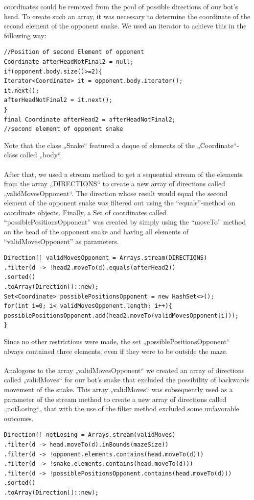 \documentclass[a4paper,12pt]{article}
\begin{document}
coordinates could be removed from the pool of possible directions of our bot’s head. To create such
an array, it was necessary to determine the coordinate of the second element of the opponent snake.
We used an iterator to achieve this in the following way:\\
\begin{verbatim}
//Position of second Element of opponent
Coordinate afterHeadNotFinal2 = null;
if(opponent.body.size()>=2){
Iterator<Coordinate> it = opponent.body.iterator();
it.next();
afterHeadNotFinal2 = it.next();
}
final Coordinate afterHead2 = afterHeadNotFinal2;
//second element of opponent snake
\end{verbatim}
Note that the class „Snake“ featured a deque of elements of the „Coordinate“-class called „body“.\\
\\
After that, we used a stream method to get a sequential stream of the elements from the array
„DIRECTIONS“ to create a new array of directions called „validMovesOpponent“. The direction
whose result would equal the second element of the opponent snake was filtered out using the “equals”-method on coordinate objects. Finally, a Set of coordinates called
“possiblePositionsOpponent” was created by simply using the “moveTo” method on the head of the
opponent snake and having all elements of “validMovesOpponent” as parameters.
\begin{verbatim}
Direction[] validMovesOpponent = Arrays.stream(DIRECTIONS)
.filter(d -> !head2.moveTo(d).equals(afterHead2))
.sorted()
.toArray(Direction[]::new);
Set<Coordinate> possiblePositionsOpponent = new HashSet<>();
for(int i=0; i< validMovesOpponent.length; i++){
possiblePositionsOpponent.add(head2.moveTo(validMovesOpponent[i]));
}
\end{verbatim}


Since no other restrictions were made, the set „possiblePositionsOpponent“ always contained three
elements, even if they were to be outside the maze.\\
\\
Analogous to the array „validMovesOpponent“ we created an array of directions called
„validMoves“ for our bot’s snake that excluded the possibility of backwards movement of the
snake. This array „validMoves“ was subsequently used as a parameter of the stream method to
create a new array of directions called „notLosing“, that with the use of the filter method excluded
some unfavorable outcomes.
\begin{verbatim}
Direction[] notLosing = Arrays.stream(validMoves)
.filter(d -> head.moveTo(d).inBounds(mazeSize))
.filter(d -> !opponent.elements.contains(head.moveTo(d)))
.filter(d -> !snake.elements.contains(head.moveTo(d)))
.filter(d -> !possiblePositionsOpponent.contains(head.moveTo(d)))
.sorted()
.toArray(Direction[]::new);
\end{verbatim}
\end{document}
